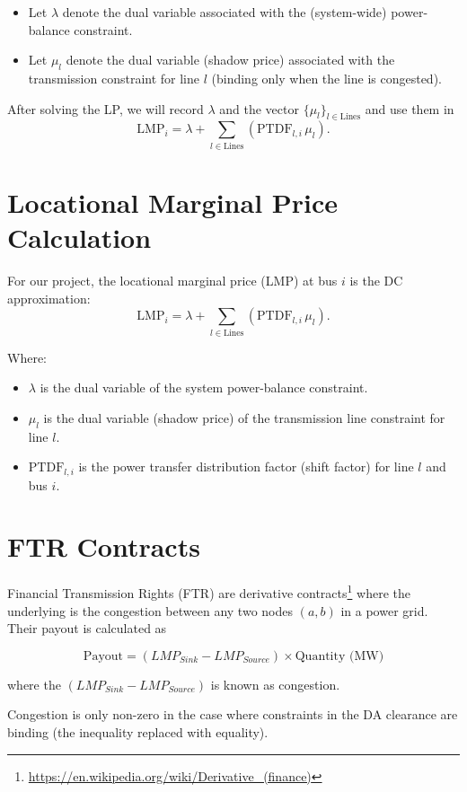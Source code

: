\documentclass[11pt]{article}
\begin{document}
\begin{itemize}
  \item Let $\lambda$ denote the dual variable associated with the (system-wide) power-balance constraint.
  \item Let $\mu_l$ denote the dual variable (shadow price) associated with the transmission constraint for line $l$ (binding only when the line is congested).
\end{itemize}
After solving the LP, we will record $\lambda$ and the vector $\{\mu_l\}_{l\in\text{Lines}}$ and use them in
\[
  \mathrm{LMP}_i = \lambda + \sum_{l\in\text{Lines}} \left(\mathrm{PTDF}_{l,i}\,\mu_l\right).
\]

\section{Locational Marginal Price Calculation}

For our project, the locational marginal price (LMP) at bus $i$ is the DC approximation:
\[
  \mathrm{LMP}_i = \lambda + \sum_{l\in\text{Lines}} \left(\mathrm{PTDF}_{l,i}\,\mu_l\right).
\]

\noindent
Where:
\begin{itemize}
  \item $\lambda$ is the dual variable of the system power-balance constraint.
  \item $\mu_l$ is the dual variable (shadow price) of the transmission line constraint for line $l$.
  \item $\mathrm{PTDF}_{l,i}$ is the power transfer distribution factor (shift factor) for line $l$ and bus $i$.
\end{itemize}

\section{FTR Contracts}
Financial Transmission Rights (FTR) are derivative contracts\footnote{\url{https://en.wikipedia.org/wiki/Derivative_(finance)}} where the underlying is the congestion between any two nodes $(a, b)$ in a power grid. Their payout is calculated as

$$\text{Payout} = (LMP_{Sink} - LMP_{Source}) \times \text{Quantity (MW)}$$

where the $(LMP_{Sink} - LMP_{Source})$ is known as congestion.

Congestion is only non-zero in the case where constraints in the DA clearance are binding (the inequality replaced with equality).
\end{document}
